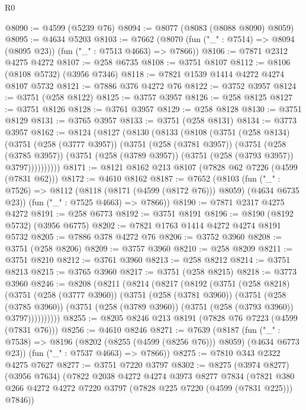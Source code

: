 \begin{lexlean}{R0}
\begin{coremodule}
@8090 := @4599 (@5239 @76)
@8094 := @8077 (@8083 (@8088 @8090) @8059)
@8095 := @4634 @5203
@8103 := @7662 (@8070 (fun ("_" : @7514) => @8094 (@8095 @23)) (fun ("_" : @7513 @4663) => @7866))
@8106 := @7871 @2312 @4275 @4272
@8107 := @258 @6735
@8108 := @3751 @8107
@8112 := @8106 (@8108 @5732) (@3956 @7346)
@8118 := @7821 @1539 @1414 @4272 @4274 @8107 @5732
@8121 := @7886 @376 @4272 @76
@8122 := @3752 @3957
@8124 := @3751 (@258 @8122)
@8125 := @3757 @3957
@8126 := @258 @8125
@8127 := @3751 @8126
@8128 := @3761 @3957
@8129 := @258 @8128
@8130 := @3751 @8129
@8131 := @3765 @3957
@8133 := @3751 (@258 @8131)
@8134 := @3773 @3957
@8162 := @8124
    (@8127
      (@8130
        (@8133
          (@8108
            (@3751
              (@258 @8134)
              (@3751
                (@258 (@3777 @3957))
                (@3751
                  (@258 (@3781 @3957))
                  (@3751
                    (@258 (@3785 @3957))
                    (@3751 (@258 (@3789 @3957)) (@3751 (@258 (@3793 @3957)) @3797))))))))))
@8171 := @8121 @8162 @213 @8107 (@7828 @62 @7226 (@4599 (@7831 @62)))
@8172 := @4610 @8162
@8187 := @7652
    (@8103
      (fun ("_" : @7526) => @8112 (@8118 (@8171 (@4599 (@8172 @76))) @8059) (@4634 @6735 @23))
      (fun ("_" : @7525 @4663) => @7866))
@8190 := @7871 @2317 @4275 @4272
@8191 := @258 @6773
@8192 := @3751 @8191
@8196 := @8190 (@8192 @5732) (@3956 @6775)
@8202 := @7821 @1763 @1414 @4272 @4274 @8191 @5732
@8205 := @7886 @378 @4272 @76
@8206 := @3752 @3960
@8208 := @3751 (@258 @8206)
@8209 := @3757 @3960
@8210 := @258 @8209
@8211 := @3751 @8210
@8212 := @3761 @3960
@8213 := @258 @8212
@8214 := @3751 @8213
@8215 := @3765 @3960
@8217 := @3751 (@258 @8215)
@8218 := @3773 @3960
@8246 := @8208
    (@8211
      (@8214
        (@8217
          (@8192
            (@3751
              (@258 @8218)
              (@3751
                (@258 (@3777 @3960))
                (@3751
                  (@258 (@3781 @3960))
                  (@3751
                    (@258 (@3785 @3960))
                    (@3751 (@258 (@3789 @3960)) (@3751 (@258 (@3793 @3960)) @3797))))))))))
@8255 := @8205 @8246 @213 @8191 (@7828 @76 @7223 (@4599 (@7831 @76)))
@8256 := @4610 @8246
@8271 := @7639
    (@8187
      (fun ("_" : @7538) => @8196 (@8202 (@8255 (@4599 (@8256 @76))) @8059) (@4634 @6773 @23))
      (fun ("_" : @7537 @4663) => @7866))
@8275 := @7810 @343 @2322 @4275 @7627
@8277 := @3751 @7220 @3797
@8302 := @8275
    (@3974 @8277)
    (@3956 @7634)
    (@7822
      @2038
      @4272
      @4274
      @3973
      @8277
      @7834
      (@7821 @380 @266 @4272 @4272 @7220 @3797 (@7828 @225 @7220 (@4599 (@7831 @225))) @7846))

\end{coremodule}
\end{lexlean}
